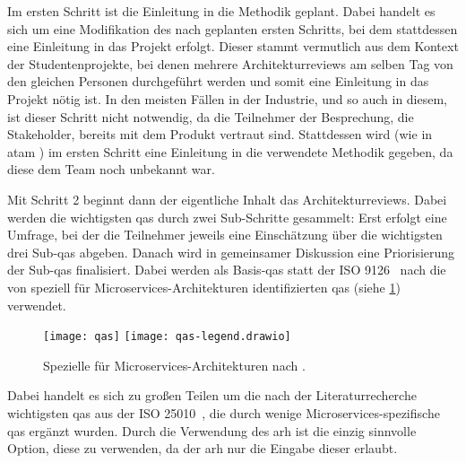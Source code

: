 Im ersten Schritt ist die Einleitung in die Methodik geplant.
Dabei handelt es sich um eine Modifikation des nach  geplanten ersten Schritts, bei dem stattdessen eine Einleitung in das Projekt erfolgt.
Dieser stammt vermutlich aus dem Kontext der Studentenprojekte, bei denen mehrere Architekturreviews am selben Tag von den gleichen Personen durchgeführt werden und somit eine Einleitung in das Projekt nötig ist.
In den meisten Fällen in der Industrie, und so auch in diesem, ist dieser Schritt nicht notwendig, da die Teilnehmer der Besprechung, die Stakeholder, bereits mit dem Produkt vertraut sind.
Stattdessen wird (wie in \gls{atam} \cite{kazman_2000}) im ersten Schritt eine Einleitung in die verwendete Methodik gegeben, da diese dem Team noch unbekannt war.

Mit Schritt 2 beginnt dann der eigentliche Inhalt das Architekturreviews.
Dabei werden die wichtigsten \glspl{qa} durch zwei Sub-Schritte gesammelt:
Erst erfolgt eine Umfrage, bei der die Teilnehmer jeweils eine Einschätzung über die wichtigsten drei Sub-\glspl{qa} abgeben.
Danach wird in gemeinsamer Diskussion eine Priorisierung der Sub-\glspl{qa} finalisiert.
Dabei werden als Basis-\glspl{qa} statt der ISO 9126~\cite{ISO-9126} nach  die von  speziell für Microservices-Architekturen identifizierten \glspl{qa} (siehe \cref{fig:qas}) verwendet.
\begin{figure}[!h]
	\centering
	\texttt{[image: qas]}
	\texttt{[image: qas-legend.drawio]}
	\caption[Spezielle  für Microservices-Architekturen]{
		Spezielle  für Microservices-Architekturen nach .
	}
	\label{fig:qas}
\end{figure}
Dabei handelt es sich zu großen Teilen um die nach der Literaturrecherche wichtigsten \glspl{qa} aus der ISO 25010~\cite{ISO-25010}, die durch wenige Microservices-spezifische \glspl{qa} ergänzt wurden.
Durch die Verwendung des \gls{arh} ist die einzig sinnvolle Option, diese zu verwenden, da der \gls{arh} nur die Eingabe dieser erlaubt.

